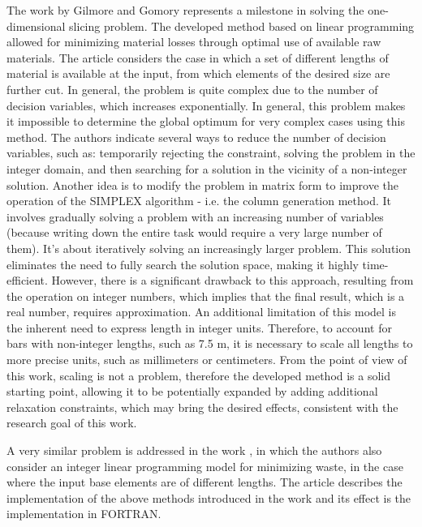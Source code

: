 The work by Gilmore and Gomory represents a \cite{linear-programming-gilmore} milestone in solving the one-dimensional slicing problem. The developed method based on linear programming allowed for minimizing material losses through optimal use of available raw materials. The article considers the case in which a set of different lengths of material is available at the input, from which elements of the desired size are further cut. In general, the problem is quite complex due to the number of decision variables, which increases exponentially. In general, this problem makes it impossible to determine the global optimum for very complex cases using this method. The authors indicate several ways to reduce the number of decision variables, such as: temporarily rejecting the constraint, solving the problem in the integer domain, and then searching for a solution in the vicinity of a non-integer solution. Another idea is to modify the problem in matrix form to improve the operation of the SIMPLEX algorithm - i.e. the column generation method. It involves gradually solving a problem with an increasing number of variables (because writing down the entire task would require a very large number of them). It's about iteratively solving an increasingly larger problem. This solution eliminates the need to fully search the solution space, making it highly time-efficient.
However, there is a significant drawback to this approach, resulting from the operation on integer numbers, which implies that the final result, which is a real number, requires approximation. An additional limitation of this model is the inherent need to express length in integer units. Therefore, to account for bars with non-integer lengths, such as 7.5 m, it is necessary to scale all lengths to more precise units, such as millimeters or centimeters. From the point of view of this work, scaling is not a problem, therefore the developed method is a solid starting point, allowing it to be potentially expanded by adding additional relaxation constraints, which may bring the desired effects, consistent with the research goal of this work.

A very similar problem is addressed in the work \cite{optimization-cloth}, in which the authors also consider an integer linear programming model for minimizing waste, in the case where the input base elements are of different lengths. The article describes the implementation of the above methods introduced in the work \cite{linear-programming-gilmore} and its effect is the implementation in FORTRAN.

